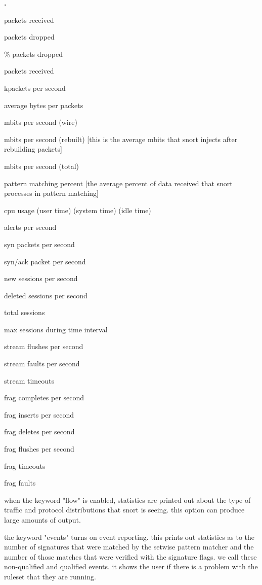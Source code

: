 \documentclass[english]{report}
\newcounter{slistnum}
\newenvironment{slist}{
    \begin{list}{
        {
            \bf \arabic{slistnum}.
        } 
    }{
        \usecounter{slistnum} 
    }
}{
    \end{list} 
}
\begin{document}
\begin{slist}
\item packets received
\item packets dropped
\item \% packets dropped
\item packets received
\item kpackets per second
\item average bytes per packets
\item mbits per second (wire)
\item mbits per second (rebuilt) [this is the average mbits that snort injects after rebuilding packets]
\item mbits per second (total)
\item pattern matching percent [the average percent of data received that snort processes in pattern matching]
\item cpu usage (user time) (system time) (idle time)
\item alerts per second
\item syn packets per second
\item syn/ack packet per second
\item new sessions per second
\item deleted sessions per second
\item total sessions
\item max sessions during time interval
\item stream flushes per second
\item stream faults per second
\item stream timeouts
\item frag completes per second
\item frag inserts per second
\item frag deletes per second
\item frag flushes per second
\item frag timeouts
\item frag faults
\end{slist}

when the keyword "flow" is enabled, statistics are printed out about the type
of traffic and protocol distributions that snort is seeing.  this option can
produce large amounts of output.

the keyword "events" turns on event reporting.  this prints out statistics as
to the number of signatures that were matched by the setwise pattern matcher
and the number of those matches that were verified with the  signature flags.
we call these non-qualified and qualified events.  it shows the user if there
is a problem with the ruleset that they are running.
\end{document}
